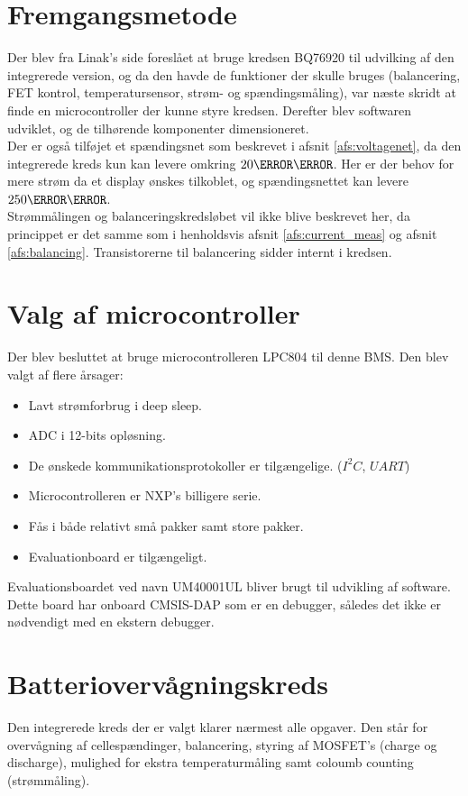 \section{Fremgangsmetode}

Der blev fra Linak's side foreslået at bruge kredsen BQ76920 til udvilking af den integrerede version, og da den havde de funktioner der skulle bruges (balancering, FET kontrol, temperatursensor, strøm- og spændingsmåling), var næste skridt at finde en microcontroller der kunne styre kredsen. Derefter blev softwaren udviklet, og de tilhørende komponenter dimensioneret. \\

Der er også tilføjet et spændingsnet som beskrevet i afsnit \ref{afs:voltagenet}, da den integrerede kreds kun kan levere omkring $20\milli\ampere$. Her er der behov for mere strøm da et display ønskes tilkoblet, og spændingsnettet kan levere $250\milli\ampere$. \\

Strømmålingen og balanceringskredsløbet vil ikke blive beskrevet her, da princippet er det samme som i henholdsvis afsnit \ref{afs:current_meas} og afsnit \ref{afs:balancing}. Transistorerne til balancering sidder internt i kredsen. 
\section{Valg af microcontroller}\label{afs:valg_af_uc}
Der blev besluttet at bruge microcontrolleren LPC804 til denne BMS. Den blev valgt af flere årsager:

\begin{itemize}[noitemsep]
	\item Lavt strømforbrug i deep sleep.
	\item ADC i 12-bits opløsning.
	\item De ønskede kommunikationsprotokoller er tilgængelige. ($I^2C$, $UART$)
	\item Microcontrolleren er NXP's billigere serie.
	\item Fås i både relativt små pakker samt store pakker.
	\item Evaluationboard er tilgængeligt.
\end{itemize}

Evaluationsboardet ved navn UM40001UL bliver brugt til udvikling af software. Dette board har onboard CMSIS-DAP som er en debugger, således det ikke er nødvendigt med en ekstern debugger. 

\section{Batteriovervågningskreds}\label{afs:bms_ic_desc}
Den integrerede kreds der er valgt klarer nærmest alle opgaver. Den står for overvågning af cellespændinger, balancering, styring af MOSFET's (charge og discharge), mulighed for ekstra temperaturmåling samt coloumb counting (strømmåling). \\

